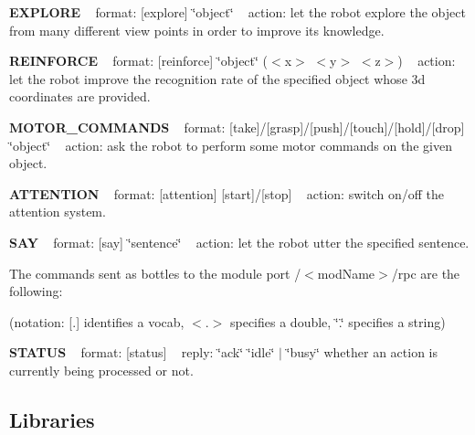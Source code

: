 {\bfseries{E\+X\+P\+L\+O\+RE}} ~\newline
format\+: \mbox{[}explore\mbox{]} \char`\"{}object\char`\"{} ~\newline
action\+: let the robot explore the object from many different view points in order to improve its knowledge.

{\bfseries{R\+E\+I\+N\+F\+O\+R\+CE}} ~\newline
format\+: \mbox{[}reinforce\mbox{]} \char`\"{}object\char`\"{} ($<$x$>$ $<$y$>$ $<$z$>$) ~\newline
action\+: let the robot improve the recognition rate of the specified object whose 3d coordinates are provided.

{\bfseries{M\+O\+T\+O\+R\+\_\+\+C\+O\+M\+M\+A\+N\+DS}} ~\newline
format\+: \mbox{[}take\mbox{]}/\mbox{[}grasp\mbox{]}/\mbox{[}push\mbox{]}/\mbox{[}touch\mbox{]}/\mbox{[}hold\mbox{]}/\mbox{[}drop\mbox{]} \char`\"{}object\char`\"{} ~\newline
action\+: ask the robot to perform some motor commands on the given object.

{\bfseries{A\+T\+T\+E\+N\+T\+I\+ON}} ~\newline
format\+: \mbox{[}attention\mbox{]} \mbox{[}start\mbox{]}/\mbox{[}stop\mbox{]} ~\newline
action\+: switch on/off the attention system.

{\bfseries{S\+AY}} ~\newline
format\+: \mbox{[}say\mbox{]} \char`\"{}sentence\char`\"{} ~\newline
action\+: let the robot utter the specified sentence.

The commands sent as bottles to the module port /$<$mod\+Name$>$/rpc are the following\+:

(notation\+: \mbox{[}.\mbox{]} identifies a vocab, $<$.$>$ specifies a double, \char`\"{}.\char`\"{} specifies a string)

{\bfseries{S\+T\+A\+T\+US}} ~\newline
format\+: \mbox{[}status\mbox{]} ~\newline
reply\+: \char`\"{}ack\char`\"{} \char`\"{}idle\char`\"{} $\vert$ \char`\"{}busy\char`\"{} whether an action is currently being processed or not.\hypertarget{group__icub__iolStateMachineHandler_lib_sec}{}\subsection{Libraries}\label{group__icub__iolStateMachineHandler_lib_sec}

